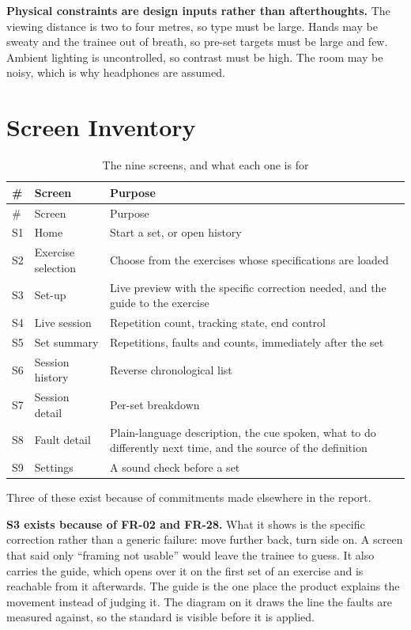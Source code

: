 \textbf{Physical constraints are design inputs rather than afterthoughts.} The viewing distance is two to four metres, so type must be large. Hands may be sweaty and the trainee out of breath, so pre-set targets must be large and few. Ambient lighting is uncontrolled, so contrast must be high. The room may be noisy, which is why headphones are assumed.

\section{Screen Inventory}
\label{sec:8.2}

{\small
\setlength{\LTpre}{6pt}\setlength{\LTpost}{8pt}
\begin{longtable}{>{\raggedright\arraybackslash}p{}>{\raggedright\arraybackslash}p{}>{\raggedright\arraybackslash}p{}}
\caption{The nine screens, and what each one is for}\\
\toprule
\# & Screen & Purpose \\
\midrule
\endfirsthead
\toprule
\# & Screen & Purpose \\
\midrule
\endhead
\bottomrule
\endfoot
\bottomrule
\endlastfoot
S1 & Home & Start a set, or open history \\
S2 & Exercise selection & Choose from the exercises whose specifications are loaded \\
S3 & Set-up & Live preview with the specific correction needed, and the guide to the exercise \\
S4 & Live session & Repetition count, tracking state, end control \\
S5 & Set summary & Repetitions, faults and counts, immediately after the set \\
S6 & Session history & Reverse chronological list \\
S7 & Session detail & Per-set breakdown \\
S8 & Fault detail & Plain-language description, the cue spoken, what to do differently next time, and the source of the definition \\
S9 & Settings & A sound check before a set \\
\end{longtable}
}

Three of these exist because of commitments made elsewhere in the report.

\textbf{S3 exists because of FR-02 and FR-28.} What it shows is the specific correction rather than a generic failure: move further back, turn side on. A screen that said only ``framing not usable'' would leave the trainee to guess. It also carries the guide, which opens over it on the first set of an exercise and is reachable from it afterwards. The guide is the one place the product explains the movement instead of judging it. The diagram on it draws the line the faults are measured against, so the standard is visible before it is applied.

